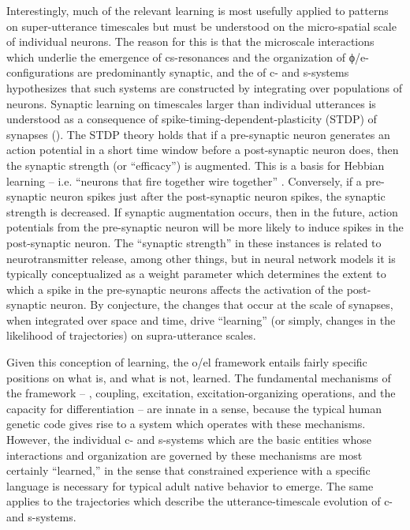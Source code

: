 Interestingly, much of the relevant learning is most usefully applied to patterns on super-utterance timescales but must be understood on the micro-spatial scale of individual neurons. The reason for this is that the microscale interactions which underlie the emergence of cs-res\-o\-nances and the organization of ϕ/e-configurations are predominantly synaptic, and the  of c- and s-systems hypothesizes that such systems are constructed by integrating over populations of neurons. Synaptic learning on timescales larger than individual utterances is understood as a consequence of spike-timing-dependent-plasticity (STDP) of synapses (\citealt{AbbottNelson2000,MarkramEtAl1997}). The STDP theory holds that if a pre-synaptic neuron generates an action potential in a short time window before a post-synaptic neuron does, then the synaptic strength (or “efficacy”) is augmented. This is a basis for Hebbian learning -- i.e. “neurons that fire together wire together” \citep{SongEtAl2000}. Conversely, if a pre-synaptic neuron spikes just after the post-synaptic neuron spikes, the synaptic strength is decreased. If synaptic augmentation occurs, then in the future, action potentials from the pre-synaptic neuron will be more likely to induce spikes in the post-synaptic neuron. The “synaptic strength” in these instances is related to neurotransmitter release, among other things, but in neural network models it is typically conceptualized as a weight parameter which determines the extent to which a spike in the pre-synaptic neurons affects the activation of the post-synaptic neuron. By conjecture, the changes that occur at the scale of synapses, when integrated over space and time, drive “learning” (or simply, changes in the likelihood of  trajectories) on supra-utterance scales. 

  Given this conception of learning, the o/el framework entails fairly specific positions on what is, and what is not, learned. The fundamental mechanisms of the framework -- , coupling, excitation, excitation-organizing operations, and the capacity for differentiation -- are innate in a sense, because the typical human genetic code gives rise to a system which operates with these mechanisms. However, the individual c- and s-systems which are the basic entities whose interactions and organization are governed by these mechanisms are most certainly “learned,” in the sense that constrained experience with a specific language is necessary for typical adult native  behavior to emerge. The same applies to the  trajectories which describe the utterance-timescale evolution of c- and s-systems.

